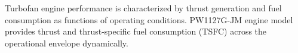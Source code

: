 Turbofan engine performance is characterized by thrust generation and fuel consumption as functions of operating conditions. PW1127G-JM engine model provides thrust and thrust-specific fuel consumption (TSFC) across the operational envelope dynamically.

